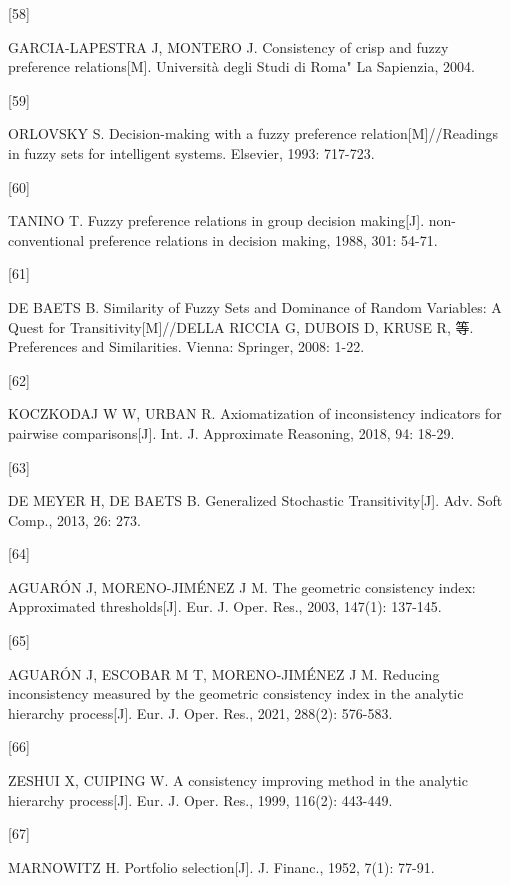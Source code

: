 \documentclass[
  letterpaper,
  DIV=11,
  numbers=noendperiod]{scrartcl}
\newlength{\cslhangindent}
\newlength{\csllabelwidth}
\newenvironment{CSLReferences}[2] %
 {\begin{list}{}{%
  \setlength{\itemindent}{0pt}
  \setlength{\leftmargin}{0pt}
  \setlength{\parsep}{0pt}
  \ifodd #1
   \setlength{\leftmargin}{\cslhangindent}
   \setlength{\itemindent}{-1\cslhangindent}
  \fi
  \setlength{\itemsep}{#2\baselineskip}}}
 {\end{list}}
\newcommand{\CSLLeftMargin}[1]{\parbox[t]{\csllabelwidth}{\strut#1\strut}}
\newcommand{\CSLRightInline}[1]{\parbox[t]{\linewidth - \csllabelwidth}{\strut#1\strut}}
\begin{document}
\begin{CSLReferences}{0}{0}
\CSLLeftMargin{{[}58{]} }%
\CSLRightInline{GARCIA-LAPESTRA J, MONTERO J. Consistency of crisp and
fuzzy preference relations{[}M{]}. Universit{à} degli Studi di Roma" La
Sapienzia, 2004.}

\CSLLeftMargin{{[}59{]} }%
\CSLRightInline{ORLOVSKY S. Decision-making with a fuzzy preference
relation{[}M{]}//Readings in fuzzy sets for intelligent systems.
Elsevier, 1993: 717-723.}

\CSLLeftMargin{{[}60{]} }%
\CSLRightInline{TANINO T. Fuzzy preference relations in group decision
making{[}J{]}. non-conventional preference relations in decision making,
1988, 301: 54-71.}

\CSLLeftMargin{{[}61{]} }%
\CSLRightInline{DE BAETS B. Similarity of {Fuzzy Sets} and {Dominance}
of {Random Variables}: A {Quest} for {Transitivity}{[}M{]}//DELLA RICCIA
G, DUBOIS D, KRUSE R, 等. Preferences and {Similarities}. Vienna:
Springer, 2008: 1-22.}

\CSLLeftMargin{{[}62{]} }%
\CSLRightInline{KOCZKODAJ W W, URBAN R. Axiomatization of inconsistency
indicators for pairwise comparisons{[}J{]}. Int. J. Approximate
Reasoning, 2018, 94: 18-29.}

\CSLLeftMargin{{[}63{]} }%
\CSLRightInline{DE MEYER H, DE BAETS B. Generalized Stochastic
Transitivity{[}J{]}. Adv. Soft Comp., 2013, 26: 273.}

\CSLLeftMargin{{[}64{]} }%
\CSLRightInline{AGUARÓN J, MORENO-JIMÉNEZ J M. The geometric consistency
index: Approximated thresholds{[}J{]}. Eur. J. Oper. Res., 2003, 147(1):
137-145.}

\CSLLeftMargin{{[}65{]} }%
\CSLRightInline{AGUARÓN J, ESCOBAR M T, MORENO-JIMÉNEZ J M. Reducing
inconsistency measured by the geometric consistency index in the
analytic hierarchy process{[}J{]}. Eur. J. Oper. Res., 2021, 288(2):
576-583.}

\CSLLeftMargin{{[}66{]} }%
\CSLRightInline{ZESHUI X, CUIPING W. A consistency improving method in
the analytic hierarchy process{[}J{]}. Eur. J. Oper. Res., 1999, 116(2):
443-449.}

\CSLLeftMargin{{[}67{]} }%
\CSLRightInline{MARNOWITZ H. Portfolio selection{[}J{]}. J. Financ.,
1952, 7(1): 77-91.}


\end{CSLReferences}
\end{document}
